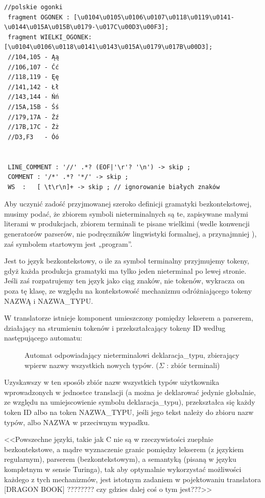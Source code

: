 \begin{lstlisting}[basicstyle=\scriptsize\ttfamily,breaklines=true]
//polskie ogonki
 fragment OGONEK : [\u0104\u0105\u0106\u0107\u0118\u0119\u0141-\u0144\u015A\u015B\u0179-\u017C\u00D3\u00F3];
 fragment WIELKI_OGONEK: [\u0104\u0106\u0118\u0141\u0143\u015A\u0179\u017B\u00D3];
 //104,105 - Ąą
 //106,107 - Ćć
 //118,119 - Ęę
 //141,142 - Łł
 //143,144 - Ńń
 //15A,15B - Śś
 //179,17A - Źź
 //17B,17C - Żż
 //D3,F3   - Óó


 LINE_COMMENT : '//' .*? (EOF|'\r'? '\n') -> skip ;
 COMMENT : '/*' .*? '*/' -> skip ;
 WS  :   [ \t\r\n]+ -> skip ; // ignorowanie białych znaków
\end{lstlisting}
\lstset{
    escapechar=|,
    breaklines=true
}
\restoregeometry %

Aby uczynić zadość przyjmowanej szeroko definicji gramatyki bezkontekstowej\cite[str.~158]{hopcroft_automaty}, musimy podać, że zbiorem symboli nieterminalnych są te, zapisywane małymi literami w produkcjach, zbiorem terminali te pisane wielkimi (wedle konwencji generatorów parserów, nie podręczników lingwistyki formalnej, a przynajmniej \cite{hopcroft_automaty}), zaś symbolem startowym jest „program”. 

Jest to język bezkontekstowy, o ile za symbol terminalny przyjmujemy tokeny, gdyż każda produkcja gramatyki ma tylko jeden nieterminal po lewej stronie. Jeśli zaś rozpatrujemy ten język jako ciąg znaków, nie tokenów, wykracza on poza tę klasę, ze względu na kontekstowość mechanizmu odróżniającego tokeny NAZWĄ i NAZWA\_TYPU.

W translatorze istnieje komponent umieszczony pomiędzy lekserem a parserem, działający na strumieniu tokenów i przekształcający tokeny ID według następującego automatu:

\begin{figure}[h]
    \centering
    
    \caption{Automat odpowiadający nieterminalowi deklaracja\_typu, zbierający wpierw nazwy wszystkich nowych typów. ($\Sigma$ : zbiór terminali) }
\end{figure}
Uzyskawszy w ten sposób zbiór nazw wszystkich typów użytkownika wprowadzonych w jednostce translacji (a można je deklarować jedynie globalnie, ze względu na umiejscowienie symbolu deklaracja\_typu), przekształca się każdy token ID albo na token NAZWA\_TYPU, jeśli jego tekst należy do zbioru nazw typów, albo NAZWA w przeciwnym wypadku.

<<Powszechne języki, takie jak C nie są w rzeczywistości zuepłnie bezkontekstowe, a mądre wyznaczenie granic pomiędzy lekserem (z językiem regularnym), parserem (bezkontekstowym), a semantyką (pisaną w języku kompletnym w sensie Turinga), tak aby optymalnie wykorzystać możliwości każdego z tych mechanizmów, jest istotnym zadaniem w pojektowaniu translatora [DRAGON BOOK] ???????? czy gdzies dalej coś o tym jest???>>

